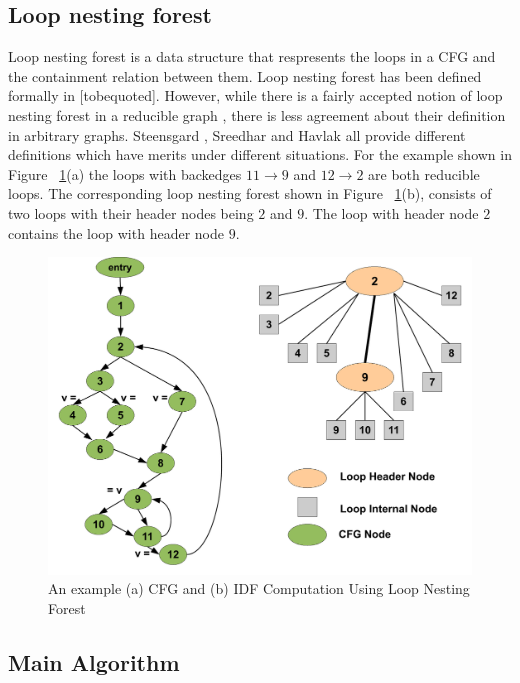     \subsection{Loop nesting forest}
     Loop nesting forest is a data structure that respresents the loops in a CFG
    and the containment relation between them. Loop nesting forest has been defined formally in [tobequoted]. However, while there is a fairly accepted notion of
    loop nesting forest in a reducible graph \cite{morgan_book}, there is less agreement about their
    definition in arbitrary graphs. Steensgard \cite{steensgard}, Sreedhar \cite{sreedhar} and Havlak
    \cite{havlak} all provide different definitions which have merits under different situations. 
    For the example shown in Figure ~\ref{fig:lnf}(a) the loops with backedges $11 \rightarrow 9$ and
    $12 \rightarrow 2$ are both reducible loops. The corresponding loop nesting forest shown in Figure ~\ref{fig:lnf}(b), consists of two loops
    with their header nodes being $2$ and $9$. 
    The loop with header node $2$ contains the loop with header node $9$.

    \begin{figure}[htb]
    \centerline{\includegraphics[scale=0.3]{lnfred.pdf}}
    \caption{An example (a) CFG and (b) IDF Computation Using Loop Nesting Forest }
    \label{fig:lnf}
    \end{figure} 


    \subsection{Main Algorithm}
    
